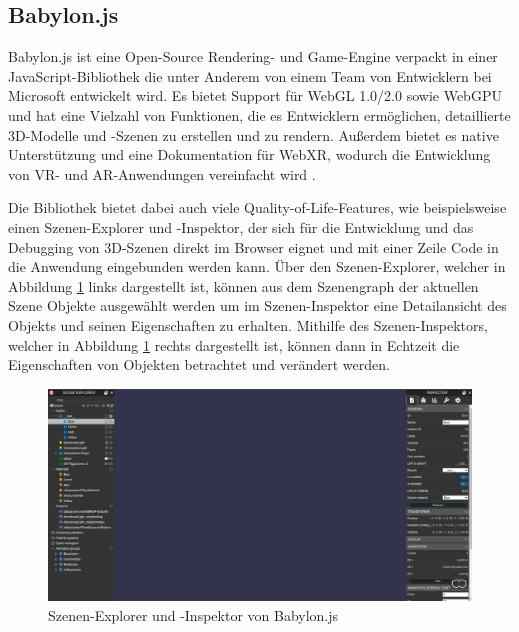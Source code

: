 \subsection{Babylon.js}

Babylon.js ist eine Open-Source Rendering- und Game-Engine verpackt in einer JavaScript-Bibliothek die unter Anderem von einem Team von Entwicklern bei Microsoft entwickelt wird.
Es bietet Support für WebGL 1.0/2.0 sowie WebGPU und hat eine Vielzahl von Funktionen, die es Entwicklern ermöglichen, detaillierte 3D-Modelle und -Szenen zu erstellen und zu rendern.
Außerdem bietet es native Unterstützung und eine Dokumentation für WebXR, wodurch die Entwicklung von VR- und AR-Anwendungen vereinfacht wird \autocite[][]{babylon-features}.

Die Bibliothek bietet dabei auch viele Quality-of-Life-Features, wie beispielsweise einen Szenen-Explorer und -Inspektor, der sich für die Entwicklung und das Debugging von 3D-Szenen direkt im Browser eignet und mit einer Zeile Code in die Anwendung eingebunden werden kann.
Über den Szenen-Explorer, welcher in Abbildung \ref{fig:babylon-inspector} links dargestellt ist, können aus dem Szenengraph der aktuellen Szene Objekte ausgewählt werden um im Szenen-Inspektor eine Detailansicht des Objekts und seinen Eigenschaften zu erhalten.
Mithilfe des Szenen-Inspektors, welcher in Abbildung \ref{fig:babylon-inspector} rechts dargestellt ist, können dann in Echtzeit die Eigenschaften von Objekten betrachtet und verändert werden.

\begin{figure}[H]
  \centering
  \includegraphics[width=1\textwidth]{images/Babylon-Inspector.png}
  \caption{Szenen-Explorer und -Inspektor von Babylon.js}
  \label{fig:babylon-inspector}
\end{figure}

